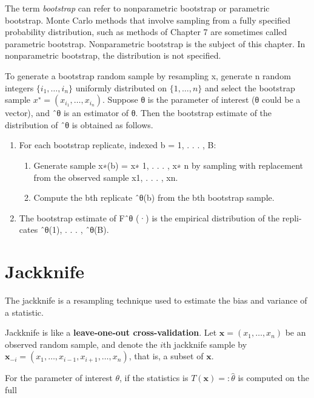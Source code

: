 \documentclass[
  letterpaper,
  DIV=11,
  numbers=noendperiod]{scrreprt}
\providecommand{\tightlist}{%
  \setlength{\itemsep}{0pt}\setlength{\parskip}{0pt}}
\begin{document}
The term \emph{bootstrap} can refer to nonparametric bootstrap or
parametric bootstrap. Monte Carlo methods that involve sampling from a
fully specified probability distribution, such as methods of Chapter 7
are sometimes called parametric bootstrap. Nonparametric bootstrap is
the subject of this chapter. In nonparametric bootstrap, the
distribution is not specified.

To generate a bootstrap random sample by resampling x, generate n random
integers \(\{i_1,\dots, i_n\}\) uniformly distributed on
\(\{1,\dots , n\}\) and select the bootstrap sample
\(x^∗ = (x_{i_1} ,\dots, x_{i_n} )\). Suppose θ is the parameter of
interest (θ could be a vector), and ˆθ is an estimator of θ. Then the
bootstrap estimate of the distribution of ˆθ is obtained as follows.

\begin{enumerate}
\def\labelenumi{\arabic{enumi}.}
\tightlist
\item
  For each bootstrap replicate, indexed b = 1, . . . , B:

  \begin{enumerate}
  \def\labelenumii{(\alph{enumii})}
  \tightlist
  \item
    Generate sample x∗(b) = x∗ 1, . . . , x∗ n by sampling with
    replacement from the observed sample x1, . . . , xn.
  \item
    Compute the bth replicate ˆθ(b) from the bth bootstrap sample.
  \end{enumerate}
\item
  The bootstrap estimate of Fˆθ (·) is the empirical distribution of the
  repli- cates ˆθ(1), . . . , ˆθ(B).
\end{enumerate}

\section{Jackknife}\label{jackknife}

The jackknife is a resampling technique used to estimate the bias and
variance of a statistic.

Jackknife is like a \textbf{leave-one-out cross-validation}. Let
\(\mathbf{x}= (x_1,\dots,x_n)\) be an observed random sample, and denote
the \(i\)th jackknife sample by
\(\mathbf{x}_{-i} = (x_1,\dots,x_{i-1},x_{i+1},\dots,x_n)\), that is, a
subset of \(\mathbf{x}\).

For the parameter of interest \(\theta\), if the statistics is
\(T(\mathbf{x})=:\hat{\theta}\) is computed on the full
\end{document}
